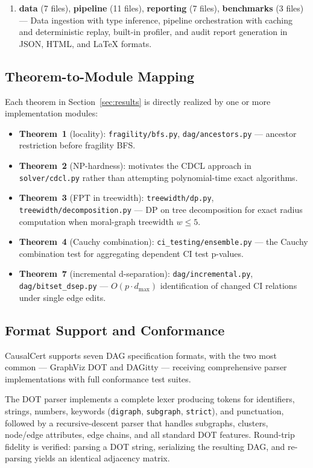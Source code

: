 \documentclass[11pt,a4paper]{article}
\theoremstyle{definition}
\theoremstyle{remark}
\begin{document}
\begin{enumerate}
  \item \textbf{data} (7 files), \textbf{pipeline} (11 files),
    \textbf{reporting} (7 files), \textbf{benchmarks} (3 files) --- Data
    ingestion with type inference, pipeline orchestration with caching and
    deterministic replay, built-in profiler, and audit report generation in
    JSON, HTML, and \LaTeX{} formats.
\end{enumerate}

\subsection{Theorem-to-Module Mapping}\label{sec:theorem_map}

Each theorem in Section~\ref{sec:results} is directly realized by one or more
implementation modules:
\begin{itemize}
  \item \textbf{Theorem~1} (locality): \texttt{fragility/bfs.py},
    \texttt{dag/ancestors.py} --- ancestor restriction before fragility BFS.
  \item \textbf{Theorem~2} (NP-hardness): motivates the CDCL approach in
    \texttt{solver/cdcl.py} rather than attempting polynomial-time exact algorithms.
  \item \textbf{Theorem~3} (FPT in treewidth): \texttt{treewidth/dp.py},
    \texttt{treewidth/decomposition.py} --- DP on tree decomposition for exact
    radius computation when moral-graph treewidth $w \leq 5$.
  \item \textbf{Theorem~4} (Cauchy combination): \texttt{ci\_testing/ensemble.py}
    --- the Cauchy combination test for aggregating dependent CI test p-values.
  \item \textbf{Theorem~7} (incremental d-separation):
    \texttt{dag/incremental.py}, \texttt{dag/bitset\_dsep.py} --- $O(p \cdot
    d_{\max})$ identification of changed CI relations under single edge edits.
\end{itemize}

\subsection{Format Support and Conformance}\label{sec:formats}

CausalCert supports seven DAG specification formats, with the two most common
--- GraphViz DOT and DAGitty --- receiving comprehensive parser implementations
with full conformance test suites.

The DOT parser implements a complete lexer producing tokens for identifiers,
strings, numbers, keywords (\texttt{digraph}, \texttt{subgraph}, \texttt{strict}),
and punctuation, followed by a recursive-descent parser that handles subgraphs,
clusters, node/edge attributes, edge chains, and all standard DOT features.
Round-trip fidelity is verified: parsing a DOT string, serializing the resulting
DAG, and re-parsing yields an identical adjacency matrix.
\end{document}
